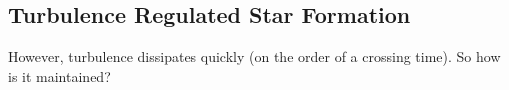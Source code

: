 \subsection{Turbulence Regulated Star Formation}\label{sec:turb}

However, turbulence dissipates quickly (on the order of a crossing time). So how is it maintained?
